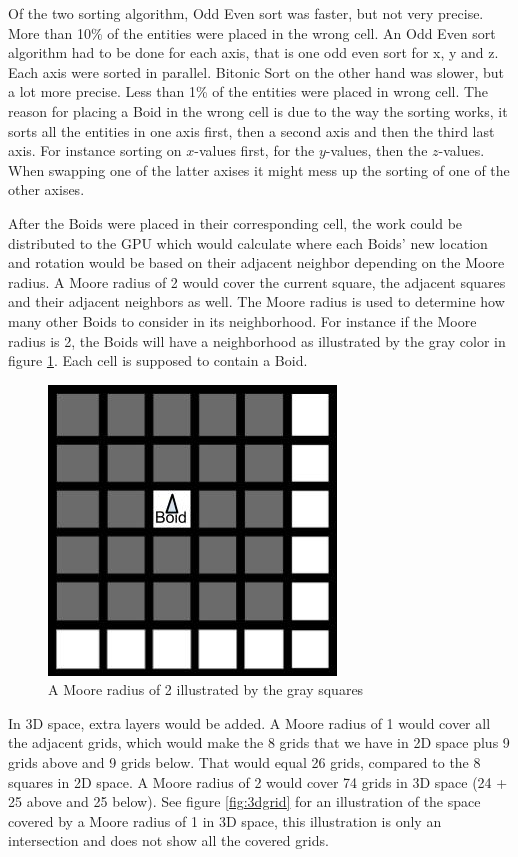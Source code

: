Of the two sorting algorithm, Odd Even sort was faster, but not very precise. More than 10\% of the entities were placed in the wrong cell. An Odd Even sort algorithm had to be done for each axis, that is one odd even sort for x, y and z. Each axis were sorted in parallel.
Bitonic Sort on the other hand was slower, but a lot more precise. Less than 1\% of the entities were placed in wrong cell. The reason for placing a Boid in the wrong cell is due to the way the sorting works, it sorts all the entities in one axis first, then a second axis and then the third last axis. For instance sorting on $x$-values first, for the $y$-values, then the $z$-values. When swapping one of the latter axises it might mess up the sorting of one of the other axises.

After the Boids were placed in their corresponding cell, the work could be distributed to the GPU which would calculate where each Boids' new location and rotation would be based on their adjacent neighbor depending on the Moore radius. A Moore radius of 2 would cover the current square, the adjacent squares and their adjacent neighbors as well. The Moore radius is used to determine how many other Boids to consider in its neighborhood. For instance if the Moore radius is 2, the Boids will have a neighborhood as illustrated by the gray color in figure \ref{fig:moore}. Each cell is supposed to contain a Boid.
\begin{figure}[H]
    \centering
    \includegraphics[width=0.3\linewidth]{images/moore}
    \caption[Moore radius illustrated, 2D]{A Moore radius of 2 illustrated by the gray squares}\label{fig:moore}
\end{figure}
In 3D space, extra layers would be added. A Moore radius of 1 would cover all the adjacent grids, which would make the 8 grids that we have in 2D space plus 9 grids above and 9 grids below. That would equal 26 grids, compared to the 8 squares in 2D space. A Moore radius of 2 would cover 74 grids in 3D space (24 + 25 above and 25 below). See figure \ref{fig:3dgrid} for an illustration of the space covered by a Moore radius of 1 in 3D space, this illustration is only an intersection and does not show all the covered grids.
